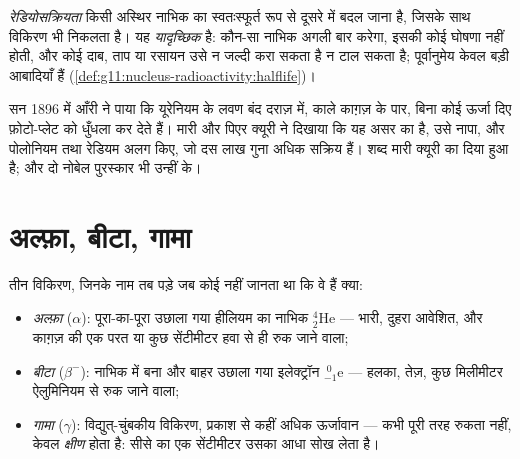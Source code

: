 \begin{definition}[रेडियोसक्रियता]\label{def:g11:nucleus-radioactivity:radioactivity}
\emph{रेडियोसक्रियता} किसी अस्थिर नाभिक का
स्वतःस्फूर्त रूप से दूसरे  में बदल जाना है, जिसके साथ
विकिरण भी निकलता है। यह \emph{यादृच्छिक} है: कौन-सा नाभिक अगली बार
 करेगा, इसकी कोई घोषणा नहीं होती, और कोई दाब, ताप या रसायन उसे न
जल्दी करा सकता है न टाल सकता है; पूर्वानुमेय केवल बड़ी आबादियाँ हैं (\cref{def:g11:nucleus-radioactivity:halflife})।
\end{definition}

\begin{remark}[बेक्रेल और क्यूरी दंपती]\label{rem:g11:nucleus-radioactivity:curie}
सन 1896 में आँरी  ने पाया कि यूरेनियम के लवण बंद दराज़ में, काले काग़ज़
के पार, बिना कोई ऊर्जा दिए फ़ोटो-प्लेट को धुँधला कर देते हैं। मारी
और पिएर क्यूरी ने दिखाया कि यह असर  का है, उसे नापा, और पोलोनियम तथा
रेडियम अलग किए, जो दस लाख गुना अधिक सक्रिय हैं। \emph{}
शब्द मारी क्यूरी का दिया हुआ है; और दो नोबेल पुरस्कार भी उन्हीं के।
\end{remark}

\section{अल्फ़ा, बीटा, गामा}

\begin{definition}[तीन ऐतिहासिक विकिरण]\label{def:g11:nucleus-radioactivity:abg}
तीन विकिरण, जिनके नाम तब पड़े जब कोई नहीं जानता था कि वे हैं क्या:
\begin{itemize}
  \item \emph{अल्फ़ा} ($\alpha$): पूरा-का-पूरा उछाला गया
        हीलियम का नाभिक ${}^{4}_{2}\mathrm{He}$ --- भारी, दुहरा आवेशित, और काग़ज़ की
        एक परत या कुछ सेंटीमीटर हवा से ही रुक जाने वाला;
  \item \emph{बीटा} ($\beta^-$): नाभिक में बना और
        बाहर उछाला गया इलेक्ट्रॉन ${}^{\;0}_{-1}\mathrm{e}$ --- हलका, तेज़, कुछ मिलीमीटर
        ऐलुमिनियम से रुक जाने वाला;
  \item \emph{गामा} ($\gamma$): विद्युत्-चुंबकीय विकिरण,
        प्रकाश से कहीं अधिक ऊर्जावान --- कभी पूरी तरह रुकता नहीं, केवल
        \emph{क्षीण} होता है: सीसे का एक सेंटीमीटर उसका आधा
        सोख लेता है।
\end{itemize}
\end{definition}

